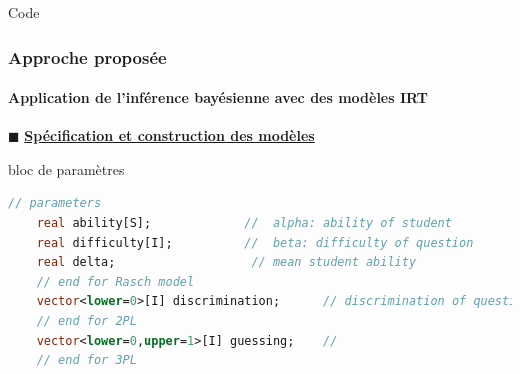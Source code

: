 \documentclass[aspectratio=169,professionalfonts, 12pt]{beamer}
\begin{document}
\begin{frame}[fragile]{Code}
  \frametitle{Approche proposée}
  \framesubtitle{Application de l'inférence bayésienne avec des modèles IRT}
  \justifying 
  \(\displaystyle \blacksquare \) \textbf{\underline{Spécification et construction des modèles}}
  \begin{minipage}{\textwidth}
  \begin{block}{bloc de paramètres}
    \begin{lstlisting}[language=Stan,basicstyle=\scriptsize,framesep=4.5mm,framexleftmargin=2.5mm,tabsize=2]
    	// parameters
    real ability[S];             //  alpha: ability of student
    real difficulty[I];          //  beta: difficulty of question
    real delta;                   // mean student ability
    // end for Rasch model
    vector<lower=0>[I] discrimination;      // discrimination of question
    // end for 2PL
    vector<lower=0,upper=1>[I] guessing;    //
    // end for 3PL
    \end{lstlisting}
  \end{block}
  \end{minipage}
\end{frame}
\end{document}
